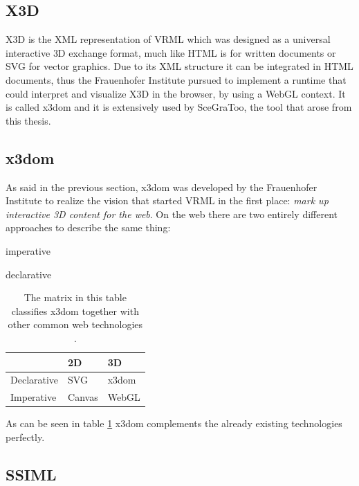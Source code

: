 \subsection{X3D}
\label{x3d} \gls{X3D} \cite{x3d} is the \gls{XML} representation of \gls{VRML} which was designed as a
universal interactive \gls{3D} exchange format, much like \gls{HTML} is for written
documents or \gls{SVG} for vector graphics. Due to its \gls{XML} structure it can be
integrated in \gls{HTML} documents, thus the Frauenhofer Institute pursued to
implement a runtime that could interpret and visualize \gls{X3D} in the browser, by
using a \gls{WebGL} context. It is called x3dom \cite{x3dom} and it is extensively used
by SceGraToo, the tool that arose from this thesis.

\subsection{x3dom}
\label{par:x3dom}

As said in the previous section, x3dom was developed by the Frauenhofer
Institute to realize the vision that started \gls{VRML} in the first place: \emph{mark
up interactive \gls{3D} content for the web}. On the web there are two entirely
different approaches to describe the same thing:

\begin{itemize*}
  \item imperative
  \item declarative
\end{itemize*}

\begin{longtable}[c]{@{}lll@{}}
  \caption{The matrix in this table classifies x3dom together with other common web technologies \cite{x3dom}.\label{tab:feature_matrix}}\\
  \toprule
  & 2D & \gls{3D} \tabularnewline
  \midrule
  \endhead
  Declarative & \gls{SVG} \cite{svg} & x3dom \cite{x3dom} \tabularnewline
  Imperative  & Canvas \cite{canvas} & \gls{WebGL} \cite{webgl} \tabularnewline
  \bottomrule
\end{longtable}

As can be seen in table \ref{tab:feature_matrix} x3dom complements the already existing technologies
perfectly.

\clearpage
\subsection{SSIML}
\label{ssiml}

